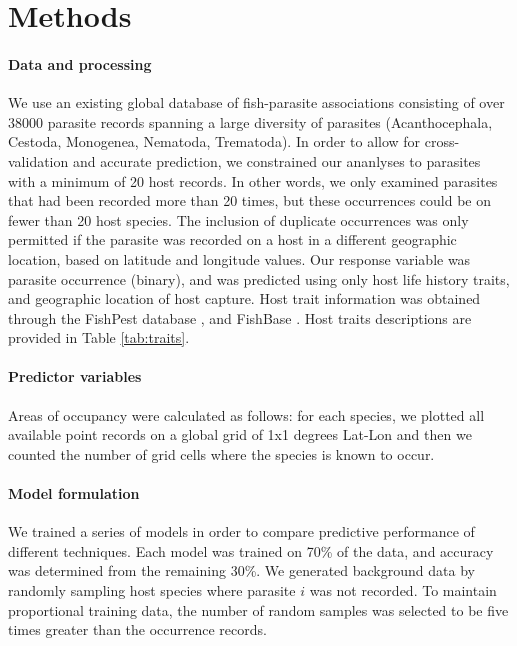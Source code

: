 \documentclass[12pt]{article}
\begin{document}
\section{Methods}

 \paragraph{Data and processing}
 We use an existing global database of fish-parasite associations \citep{strona2013} consisting of over 38000 parasite records spanning a large diversity of parasites (Acanthocephala, Cestoda, Monogenea, Nematoda, Trematoda). In order to allow for cross-validation and accurate prediction, we constrained our ananlyses to parasites with a minimum of 20 host records. In other words, we only examined parasites that had been recorded more than 20 times, but these occurrences could be on fewer than 20 host species. The inclusion of duplicate occurrences was only permitted if the parasite was recorded on a host in a different geographic location, based on latitude and longitude values. Our response variable was parasite occurrence (binary), and was predicted using only host life history traits, and geographic location of host capture. Host trait information was obtained through the FishPest database \citep{strona2012, strona2013}, and FishBase \citep{froese2010}. Host traits descriptions are provided in Table \ref{tab:traits}.
 
 
 \paragraph{Predictor variables}
 
 Areas of occupancy were calculated as follows: for each species, we plotted all available point records on a global grid of 1x1 degrees  Lat-Lon and then we counted the number of grid cells where the species is known to occur.
 
 
 \paragraph{Model formulation}
  We trained a series of models in order to compare predictive performance of different techniques. Each model was trained on 70\% of the data, and accuracy was determined from the remaining 30\%. We generated background data by randomly sampling host species where parasite $i$ was not recorded. To maintain proportional training data, the number of random samples was selected to be five times greater than the occurrence records. 
  
\end{document}
